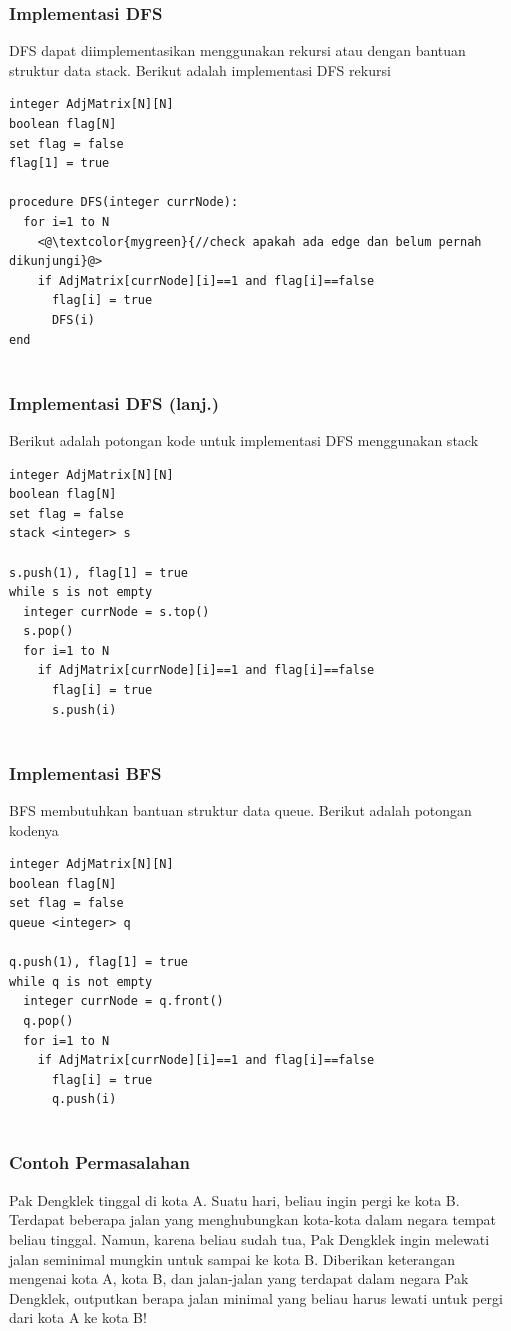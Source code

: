 \begin{frame}[fragile]
\frametitle{Implementasi DFS}
DFS dapat diimplementasikan menggunakan rekursi atau dengan bantuan struktur data stack. Berikut adalah implementasi DFS rekursi\newline
\begin{lstlisting}
integer AdjMatrix[N][N]
boolean flag[N]
set flag = false
flag[1] = true

procedure DFS(integer currNode):
  for i=1 to N
    <@\textcolor{mygreen}{//check apakah ada edge dan belum pernah dikunjungi}@>
    if AdjMatrix[currNode][i]==1 and flag[i]==false
      flag[i] = true
      DFS(i)
end
        
\end{lstlisting}
\end{frame}

\begin{frame}[fragile]
\frametitle{Implementasi DFS (lanj.)}
Berikut adalah potongan kode untuk implementasi DFS menggunakan stack\newline
\begin{lstlisting}
integer AdjMatrix[N][N]
boolean flag[N]
set flag = false
stack <integer> s

s.push(1), flag[1] = true
while s is not empty
  integer currNode = s.top()
  s.pop()
  for i=1 to N
    if AdjMatrix[currNode][i]==1 and flag[i]==false
      flag[i] = true
      s.push(i)
        
\end{lstlisting}
\end{frame}

\begin{frame}[fragile]
\frametitle{Implementasi BFS}
BFS membutuhkan bantuan struktur data queue. Berikut adalah potongan kodenya\newline
\begin{lstlisting}
integer AdjMatrix[N][N]
boolean flag[N]
set flag = false
queue <integer> q

q.push(1), flag[1] = true
while q is not empty
  integer currNode = q.front()
  q.pop()
  for i=1 to N
    if AdjMatrix[currNode][i]==1 and flag[i]==false
      flag[i] = true
      q.push(i)
        
\end{lstlisting}
\end{frame}

\begin{frame}
\frametitle{Contoh Permasalahan}
Pak Dengklek tinggal di kota A. Suatu hari, beliau ingin pergi ke kota B. Terdapat beberapa jalan yang menghubungkan kota-kota dalam negara tempat beliau tinggal. Namun, karena beliau sudah tua, Pak Dengklek ingin melewati jalan seminimal mungkin untuk sampai ke kota B.
\newline\newline
Diberikan keterangan mengenai kota A, kota B, dan jalan-jalan yang terdapat dalam negara Pak Dengklek, outputkan berapa jalan minimal yang beliau harus lewati untuk pergi dari kota A ke kota B!
\end{frame}

